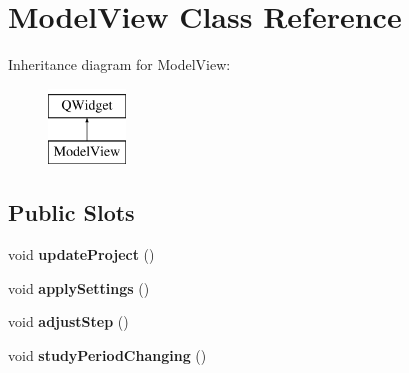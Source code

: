 \hypertarget{class_model_view}{\section{Model\-View Class Reference}
\label{class_model_view}
}
Inheritance diagram for Model\-View\-:\begin{figure}[H]
\begin{center}
\leavevmode
\includegraphics[height=2.000000cm]{class_model_view}
\end{center}
\end{figure}
\subsection*{Public Slots}
\begin{DoxyCompactItemize}
\item 
\hypertarget{class_model_view_a82652928f6fa6f0ab6aa18e7af6dd1d9}{void {\bfseries update\-Project} ()}\label{class_model_view_a82652928f6fa6f0ab6aa18e7af6dd1d9}

\item 
\hypertarget{class_model_view_a704ee61693ca6a8b90f91552fa1ff259}{void {\bfseries apply\-Settings} ()}\label{class_model_view_a704ee61693ca6a8b90f91552fa1ff259}

\item 
\hypertarget{class_model_view_a21b374f85ffb5705fd0166aeedf71998}{void {\bfseries adjust\-Step} ()}\label{class_model_view_a21b374f85ffb5705fd0166aeedf71998}

\item 
\hypertarget{class_model_view_a41b864f85e84299987b7a15b29e1a09f}{void {\bfseries study\-Period\-Changing} ()}\label{class_model_view_a41b864f85e84299987b7a15b29e1a09f}

\end{DoxyCompactItemize}
